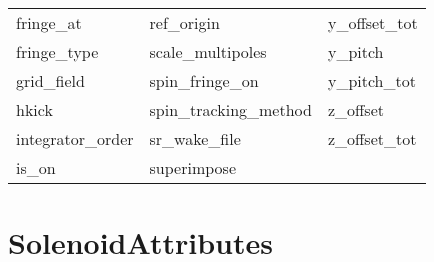 \begin{tabular}{lll}
fringe_at                   & ref_origin                  & y_offset_tot                \\
fringe_type                 & scale_multipoles            & y_pitch                     \\
grid_field                  & spin_fringe_on              & y_pitch_tot                 \\
hkick                       & spin_tracking_method        & z_offset                    \\
integrator_order            & sr_wake_file                & z_offset_tot                \\
is_on                       & superimpose                 &                             \\
 \bottomrule
 \end{tabular}
 \vfill
 
 \section{SolenoidAttributes}
 \label{s:list.solenoid}
 
